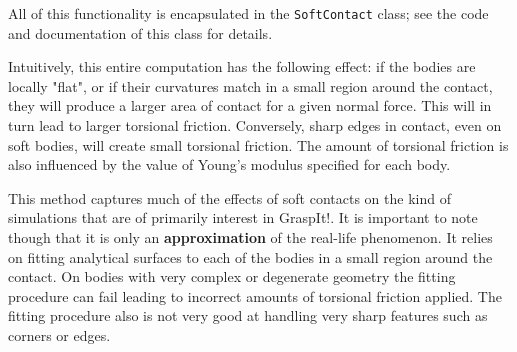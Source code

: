 All of this functionality is encapsulated in the \texttt{SoftContact}
class; see the code and documentation of this class for details.

Intuitively, this entire computation has the following effect: if the
bodies are locally "flat", or if their curvatures match in a small
region around the contact, they will produce a larger area of contact
for a given normal force. This will in turn lead to larger torsional
friction. Conversely, sharp edges in contact, even on soft bodies,
will create small torsional friction. The amount of torsional friction
is also influenced by the value of Young's modulus specified for each
body.

This method captures much of the effects of soft contacts on the kind
of simulations that are of primarily interest in GraspIt!. It is
important to note though that it is only an \textbf{approximation} of the
real-life phenomenon. It relies on fitting analytical surfaces to each
of the bodies in a small region around the contact. On bodies with
very complex or degenerate geometry the fitting procedure can fail
leading to incorrect amounts of torsional friction applied. The
fitting procedure also is not very good at handling very sharp
features such as corners or edges.


